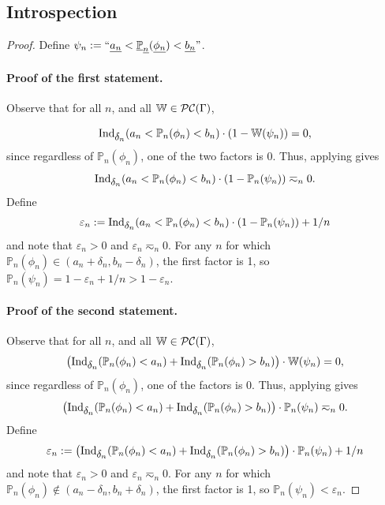\documentclass[authordate,onecolumn,noenvironments]{miri-tech-article}
\numberwithin{equation}{subsection}
\newcommand{\quot}[1]{``#1"}
\newcommand{\enc}[1]{{\underline{#1}}}
\newcommand{\seq}[1]{{\overline{#1}}}
\newcommand{\nn}{n}
\newcommand{\aff}{A}
\newcommand{\gens}{\dagger}
\newcommand{\gen}[1]{{#1^\gens}}
\newcommand{\BelState}{\mathbb{P}}
\newcommand{\pf}[2][\nn]{{#2}^{*#1}}
\newcommand{\pt}{\BelState}
\newcommand{\MP}{\seq{\pt}}
\newcommand{\ftn}{(\MP)} %
\newcommand{\cworlds}{\mathcal{P\-C}} %
\newcommand{\World}{\mathbb{W}}
\newcommand{\Theory}{\Gamma}
\newcommand{\ctsind}[1]{\operatorname{Ind}_{\text{\small{${#1}$}}}} %
\begin{document}
\subsection{Introspection}\label{app:ref}
\restateref*
\begin{proof}
  Define $\psi_n := \quot{\enc{a_\nn} < \enc{\pt}_\enc{\nn}(\enc{\phi_\nn}) < \enc{b_\nn}}$.

  \paragraph{Proof of the first statement.}

  Observe that for all $n$, and all $\World\in\cworlds(\Theory)$, 

  \[ \ctsind{\delta_n}(a_n < \pt_n(\phi_n) < b_n) \cdot (1 - \World(\psi_n))=0, \]
since regardless of $\pt_n(\phi_n)$, one of the two factors is 0.
Thus, applying  gives 
\[ \ctsind{\delta_n}(a_n < \pt_n(\phi_n) < b_n) \cdot (1-\pt_n(\psi_n)) \eqsim_n 0. \]
Define 
\[ \varepsilon_n := \ctsind{\delta_n}(a_n < \pt_n(\phi_n) < b_n) \cdot (1-\pt_n(\psi_n)) + 1/n \] 
and note that $\varepsilon_n > 0$ and $\varepsilon_n \eqsim_n 0$.  For any $n$ for which $\pt_n(\phi_n) \in (a_n+\delta_n,b_n-\delta_n)$, the first factor is 1, so $\pt_n(\psi_n) = 1 - \varepsilon_n+1/n > 1 - \varepsilon_n$.

\paragraph{Proof of the second statement.}
  Observe that for all $n$, and all $\World\in\cworlds(\Theory)$, 
\[ \left(\ctsind{\delta_n}(\pt_n(\phi_n)<a_n)+\ctsind{\delta_n}(\pt_n(\phi_n) > b_n)\right)\cdot \World(\psi_n)=0, \]
since regardless of $\pt_n(\phi_n)$, one of the factors is 0.
Thus, applying  gives 
\[ \left(\ctsind{\delta_n}(\pt_n(\phi_n)<a_n)+\ctsind{\delta_n}(\pt_n(\phi_n) > b_n)\right)\cdot \pt_n(\psi_n) \eqsim_n 0. \]
Define 
\[\varepsilon_n := \left(\ctsind{\delta_n}(\pt_n(\phi_n)<a_n)+\ctsind{\delta_n}(\pt_n(\phi_n) > b_n)\right)\cdot \pt_n(\psi_n) + 1/n\] 
and note that $\varepsilon_n > 0$ and $\varepsilon_n \eqsim_n 0$.  For any $n$ for which $\pt_n(\phi_n)\notin (a_n-\delta_n,b_n+\delta_n)$, the first factor is 1, so $\pt_n(\psi_n) < \varepsilon_n$.

\end{proof}
\end{document}
